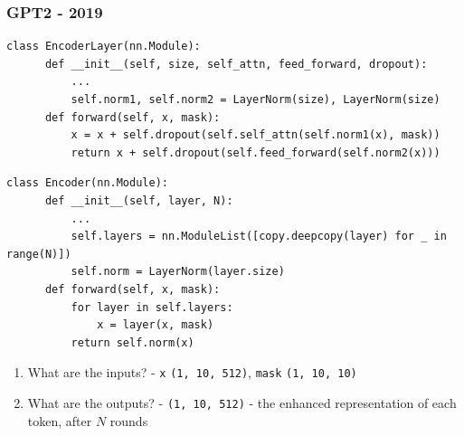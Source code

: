 \documentclass{beamer}
\newcommand{\shape}[1]{\texttt{(#1)}}
\begin{document}
\begin{frame}[fragile]
  \frametitle{GPT2 - 2019}
  \vfill
  \begin{lstlisting}[basicstyle=\ttfamily\tiny]
  class EncoderLayer(nn.Module):
      def __init__(self, size, self_attn, feed_forward, dropout):
          ...
          self.norm1, self.norm2 = LayerNorm(size), LayerNorm(size)
      def forward(self, x, mask):
          x = x + self.dropout(self.self_attn(self.norm1(x), mask))
          return x + self.dropout(self.feed_forward(self.norm2(x)))
  \end{lstlisting}
  \begin{lstlisting}[basicstyle=\ttfamily\tiny]
  class Encoder(nn.Module):
      def __init__(self, layer, N):
          ...
          self.layers = nn.ModuleList([copy.deepcopy(layer) for _ in range(N)])
          self.norm = LayerNorm(layer.size)
      def forward(self, x, mask):
          for layer in self.layers:
              x = layer(x, mask)
          return self.norm(x)
  \end{lstlisting}
  \vfill
  \begin{enumerate}
    \item<2-> What are the inputs? - \texttt{x} \shape{1, 10, 512}, \texttt{mask} \shape{1, 10, 10}
    \item<2-> What are the outputs? - \shape{1, 10, 512} - the enhanced representation of each token, after $N$ rounds
  \end{enumerate}
  \vfill
\end{frame}

\end{document}
